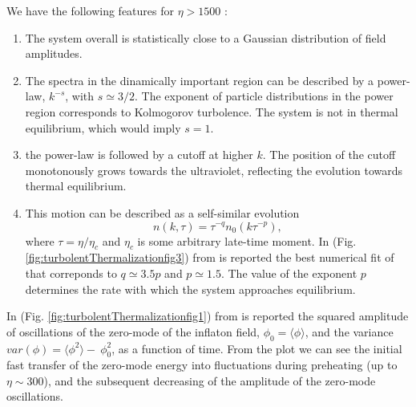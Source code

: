 \documentclass[11pt,a4paper,twoside]{book}
\begin{document}
We have the following features for $\eta > 1500$ \cite{Chap6:TurbolentThermalization}:
\begin{enumerate}
	\item The system overall is statistically close to a Gaussian distribution of field amplitudes.
	
	\item The spectra in the dinamically important region can be described by a power-law, $ k^{-s} $, with $ s \simeq 3/2 $. The exponent of particle distributions in the power region corresponds to Kolmogorov turbolence. The system is not in thermal equilibrium, which would imply $ s=1 $.
	
	\item the power-law is followed by a cutoff at higher $ k $. The position of the cutoff monotonously grows towards the ultraviolet, reflecting the evolution towards thermal equilibrium.
	
	\item This motion can be described as a self-similar evolution
	\begin{equation}
	\label{Chap6:selfSimilarEvolution}
	n(k,\tau)=\tau^{-q}n_{0}(k\tau^{-p}),
	\end{equation}
where $ \tau = \eta/\eta_{c} $ and $ \eta_{c} $ is some arbitrary late-time moment. In (Fig. \ref{fig:turbolentThermalizationfig3}) from \cite{Chap6:TurbolentThermalization} is reported the best numerical fit of \cite{Chap6:TurbolentThermalization} that correponds to $ q \simeq 3.5p $ and $ p\simeq 1.5 $. The value of the exponent $ p $ determines the rate with which the system approaches equilibrium.
\end{enumerate}
In (Fig. \ref{fig:turbolentThermalizationfig1}) from \cite{Chap6:TurbolentThermalization} is reported the squared amplitude of oscillations of the zero-mode of the inflaton field, $ \phi_{0}=\langle \phi\rangle  $, and the variance $ var(\phi)=\langle \phi^{2}\rangle  -\  \phi_{0}^{2} $, as a function of time. From the plot we can see the initial fast transfer of the zero-mode energy into fluctuations during  preheating (up to $\eta \sim 300$), and the subsequent decreasing of the amplitude of the zero-mode oscillations.
\end{document}

